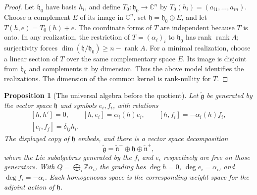 \documentclass[11pt,oneside,openany]{book}
\newtheorem{proposition}[theorem]{Proposition}
\theoremstyle{definition}
\theoremstyle{remark}
\begin{document}
\begin{proof}
Let \(\mathfrak h_0\) have basis \(h_i\), and define
\(T_0:\mathfrak h_0\to\mathbb C^n\) by
\(T_0(h_i)=(a_{i1},\ldots,a_{in})\).
Choose a complement \(E\) of its image in \(\mathbb C^n\),
set \(\mathfrak h=\mathfrak h_0\oplus E\), and let
\(T(h,e)=T_0(h)+e\). The coordinate forms of \(T\) are independent
because \(T\) is onto. In any realization, the restriction of
\(T=(\alpha_i)_i\) to \(\mathfrak h_0\) has rank
\(\operatorname{rank}A\); surjectivity forces
\(\dim(\mathfrak h/\mathfrak h_0)\ge n-\operatorname{rank}A\).
For a minimal realization, choose a linear section of \(T\) over the
same complementary space \(E\). Its image is disjoint from
\(\mathfrak h_0\) and complements it by dimension. Thus the above
model identifies the realizations. The dimension of the common
kernel is rank-nullity for \(T\).
\end{proof}

\begin{proposition}[The universal algebra before the quotient]
\label{res:KM03}
Let \(\widetilde{\mathfrak g}\) be generated by the vector space
\(\mathfrak h\) and symbols \(e_i,f_i\), with relations
\[
 \begin{gathered}
 [h,h']=0,\qquad [h,e_i]=\alpha_i(h)e_i,\qquad
 [h,f_i]=-\alpha_i(h)f_i,\\
 [e_i,f_j]=\delta_{ij}h_i .
 \end{gathered}
\]
The displayed copy of \(\mathfrak h\) embeds,
and there is a vector space decomposition
\[
 \widetilde{\mathfrak g}
   =\widetilde{\mathfrak n}^-\oplus\mathfrak h
      \oplus\widetilde{\mathfrak n}^+ ,
\]
where the Lie subalgebras generated by the \(f_i\) and \(e_i\)
respectively are free on those generators. With
\(Q=\bigoplus_i\mathbb Z\alpha_i\), the grading has
\(\deg h=0\), \(\deg e_i=\alpha_i\), and
\(\deg f_i=-\alpha_i\). Each homogeneous space is the
corresponding weight space for the adjoint action of \(\mathfrak h\).
\end{proposition}
\end{document}
